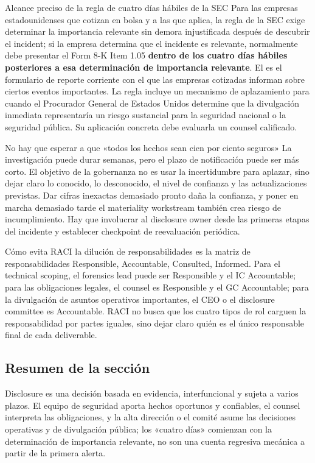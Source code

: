 \begin{importantbox}{Alcance preciso de la regla de cuatro días hábiles de la SEC}
Para las empresas estadounidenses que cotizan en bolsa y a las que aplica, la regla de la SEC exige determinar la importancia relevante sin demora injustificada después de descubrir el incident; si la empresa determina que el incidente es relevante, normalmente debe presentar el Form 8-K Item 1.05 \textbf{dentro de los cuatro días hábiles posteriores a esa determinación de importancia relevante}. El  es el formulario de reporte corriente con el que las empresas cotizadas informan sobre ciertos eventos importantes. La regla incluye un mecanismo de aplazamiento para cuando el Procurador General de Estados Unidos determine que la divulgación inmediata representaría un riesgo sustancial para la seguridad nacional o la seguridad pública. Su aplicación concreta debe evaluarla un counsel calificado.
\end{importantbox}

\begin{warningbox}{No hay que esperar a que «todos los hechos sean cien por ciento seguros»}
La investigación puede durar semanas, pero el plazo de notificación puede ser más corto. El objetivo de la gobernanza no es usar la incertidumbre para aplazar, sino dejar claro lo conocido, lo desconocido, el nivel de confianza y las actualizaciones previstas. Dar cifras inexactas demasiado pronto daña la confianza, y poner en marcha demasiado tarde el materiality workstream también crea riesgo de incumplimiento. Hay que involucrar al disclosure owner desde las primeras etapas del incidente y establecer checkpoint de reevaluación periódica.
\end{warningbox}

\begin{knowledgebox}{Cómo evita RACI la dilución de responsabilidades}
 es la matriz de responsabilidades Responsible, Accountable, Consulted, Informed. Para el technical scoping, el forensics lead puede ser Responsible y el IC Accountable; para las obligaciones legales, el counsel es Responsible y el GC Accountable; para la divulgación de asuntos operativos importantes, el CEO o el disclosure committee es Accountable. RACI no busca que los cuatro tipos de rol carguen la responsabilidad por partes iguales, sino dejar claro quién es el único responsable final de cada deliverable.
\end{knowledgebox}

\subsection{Resumen de la sección}

Disclosure es una decisión basada en evidencia, interfuncional y sujeta a varios plazos. El equipo de seguridad aporta hechos oportunos y confiables, el counsel interpreta las obligaciones, y la alta dirección o el comité asume las decisiones operativas y de divulgación pública; los «cuatro días» comienzan con la determinación de importancia relevante, no son una cuenta regresiva mecánica a partir de la primera alerta.
